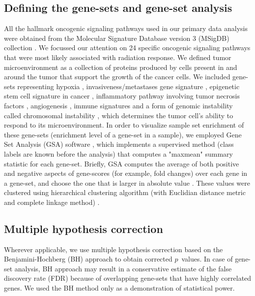 \documentclass[hidelinks,11pt]{article}
\begin{document}
\subsection*{Defining the gene-sets and gene-set analysis}

All the hallmark oncogenic signaling pathways used in our primary data analysis were obtained from the Molecular Signature Database version 3 (MSigDB) collection \cite{msigdb_hm}. We focussed our attention on 24 specific oncogenic signaling pathways that were most likely associated with radiation response. We defined tumor microenvironment as a collection of proteins produced by cells present in and around the tumor that support the growth of the cancer cells. We included gene-sets representing hypoxia \cite{hypoxia}, invasiveness/metastases gene signature \cite{IGS}, epigenetic stem cell signature in cancer \cite{epigen}, inflammatory pathway involving tumor necrosis factors \cite{TNF}, angiogenesis \cite{WH}, immune signatures \cite{immune} and a form of genomic instability called chromosomal instability \cite{CIN}, which determines the tumor cell's ability to respond to its microenvironment. In order to visualize sample set enrichment of these gene-sets (enrichment level of a gene-set in a sample), we employed Gene Set Analysis (GSA) software \cite{gsa_software}, which implements a supervised method (class labels are known before the analysis) that computes a "maxmean" summary statistic for each gene-set. Briefly, GSA computes the average of both positive and negative aspects of gene-scores (for example, fold changes) over each gene in a gene-set, and choose the one that is larger in absolute value \cite{gsa}. These values were clustered using hierarchical clustering algorithm (with Euclidian distance metric and complete linkage method) \cite{clustering}. 

\subsection*{Multiple hypothesis correction}

Wherever applicable, we use multiple hypothesis correction based on the Benjamini-Hochberg (BH) approach \cite{BH} to obtain corrected $p$~values. In case of gene-set analysis, BH approach may result in a conservative estimate of the false discovery rate (FDR) because of overlapping gene-sets that have highly correlated genes. We used the BH method only as a demonstration of statistical power. 

\end{document}
